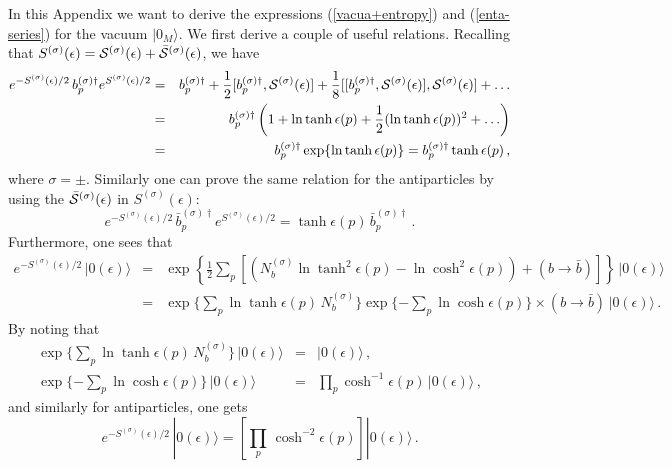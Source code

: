 \noindent In this Appendix we want to derive the expressions
(\ref{vacua+entropy}) and (\ref{enta-series}) for the vacuum
$|0_M\rangle$. We first derive a couple of useful relations.
Recalling that $S^{(\sigma)}(\epsilon) = {\cal
S}^{(\sigma)}(\epsilon) + \bar{\cal S}^{(\sigma)}(\epsilon)$, we
have
\begin{eqnarray}
  e^{-S^{(\sigma)}(\epsilon)/2}\, b^{(\sigma)\dagger}_p
 e^{S^{(\sigma)}(\epsilon)/2} &=& b^{(\sigma)\dagger}_p + \frac{1}{2}
 [b^{(\sigma)\dagger}_p,{\cal S}^{(\sigma)}(\epsilon)] + \frac{1}{8}
 [[b^{(\sigma)\dagger}_p,{\cal S}^{(\sigma)}(\epsilon)],{\cal S}^{(\sigma)}(\epsilon)] + \ldots
 \nonumber \\
 &=& b^{(\sigma)\dagger}_p \left( 1+ \ln \tanh \epsilon(p) +
 \frac{1}{2} (\ln \tanh \epsilon(p))^2 + \ldots \right)
\nonumber \\
&=& b^{(\sigma)\dagger}_p \exp \{ \ln \tanh \epsilon(p) \} =
b^{(\sigma)\dagger}_p \tanh \epsilon(p) \,, \label{a1}
\end{eqnarray}
where $\sigma = \pm$. Similarly one can prove the same relation
for the antiparticles by using the $\bar{\cal
S}^{(\sigma)}(\epsilon)$ in $S^{(\sigma)}(\epsilon)$:
 \begin{equation}
 e^{-S^{(\sigma)}(\epsilon)/2}\, \bar{b}^{(\sigma)\dagger}_p
 e^{S^{(\sigma)}(\epsilon)/2}
 =\tanh \epsilon(p) \,\bar{b}^{(\sigma)\dagger}_p \,.
\end{equation}
Furthermore, one sees that
\begin{eqnarray}\label{S0+}
e^{-S^{(\sigma)}(\epsilon)/2}\,|0(\epsilon)\rangle & =&
             \exp \left\{\frac{1}{2} \sum_p \left[\left(N_b^{(\sigma)}\ln
             \tanh^2\epsilon(p)-\ln\cosh^2\epsilon(p)\right)+(b\to {\bar
             b})\right]\right\}\,|0(\epsilon)\rangle \\
             &=&\exp\{\sum_p\ln\tanh\epsilon(p)\, N_b^{(\sigma)} \}
             \exp\{-\sum_p\ln\cosh\epsilon(p)\}\times (b\to {\bar b})\,|0(\epsilon)\rangle
             \,.  \nonumber
\end{eqnarray}
By noting that
\begin{eqnarray}\label{S1+}
 \exp\{\sum_p\ln\tanh\epsilon(p)\, N_b^{(\sigma)} \}\,|0(\epsilon)\rangle &=& |0(\epsilon)\rangle\,, \\
 \exp\{-\sum_p\ln\cosh\epsilon(p)\}\,|0(\epsilon)\rangle &=&\prod_p
 \cosh^{-1}\epsilon(p)\,|0(\epsilon)\rangle\,, \nonumber
  \end{eqnarray}
and similarly for antiparticles, one gets
\begin{equation}\label{relaz2-A}
 e^{-S^{(\sigma)}(\epsilon)/2}\,|0(\epsilon)\rangle =
 \left[\prod_p\,\cosh^{-2} \epsilon(p)\right]|0(\epsilon)\rangle\,.
\end{equation}
